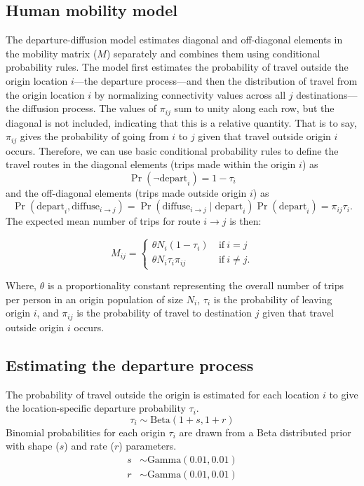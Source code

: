 \documentclass[
]{book}
\begin{document}
\subsection{Human mobility model}\label{human-mobility-model}

The departure-diffusion model estimates diagonal and off-diagonal elements in the mobility matrix (\(M\)) separately and combines them using conditional probability rules. The model first estimates the probability of travel outside the origin location \(i\)---the departure process---and then the distribution of travel from the origin location \(i\) by normalizing connectivity values across all \(j\) destinations---the diffusion process. The values of \(\pi_{ij}\) sum to unity along each row, but the diagonal is not included, indicating that this is a relative quantity. That is to say, \(\pi_{ij}\) gives the probability of going from \(i\) to \(j\) given that travel outside origin \(i\) occurs. Therefore, we can use basic conditional probability rules to define the travel routes in the diagonal elements (trips made within the origin \(i\)) as
\[
\Pr( \neg \text{depart}_i ) =  1 - \tau_i
\]
and the off-diagonal elements (trips made outside origin \(i\)) as
\[
\Pr( \text{depart}_i, \text{diffuse}_{i \rightarrow j}) = \Pr( \text{diffuse}_{i \rightarrow j} \mid \text{depart}_i ) \Pr(\text{depart}_i ) = \pi_{ij} \tau_i.
\]
The expected mean number of trips for route \(i \rightarrow j\) is then:

\begin{equation}
M_{ij} = 
\begin{cases}
\theta N_i (1-\tau_i) \ & \text{if} \ i = j \\
\theta N_i \tau_i \pi_{ij} \ & \text{if} \ i \ne j.
\end{cases}
\label{eq:M}
\end{equation}

Where, \(\theta\) is a proportionality constant representing the overall number of trips per person in an origin population of size \(N_i\), \(\tau_i\) is the probability of leaving origin \(i\), and \(\pi_{ij}\) is the probability of travel to destination \(j\) given that travel outside origin \(i\) occurs.

\subsection{Estimating the departure process}\label{estimating-the-departure-process}

The probability of travel outside the origin is estimated for each location \(i\) to give the location-specific departure probability \(\tau_i\).
\[
\tau_i \sim \text{Beta}(1+s, 1+r)
\]
Binomial probabilities for each origin \(\tau_i\) are drawn from a Beta distributed prior with shape (\(s\)) and rate (\(r\)) parameters.
\[
\begin{aligned}
s &\sim \text{Gamma}(0.01, 0.01)\\
r &\sim \text{Gamma}(0.01, 0.01)
\end{aligned}
\]
\end{document}
